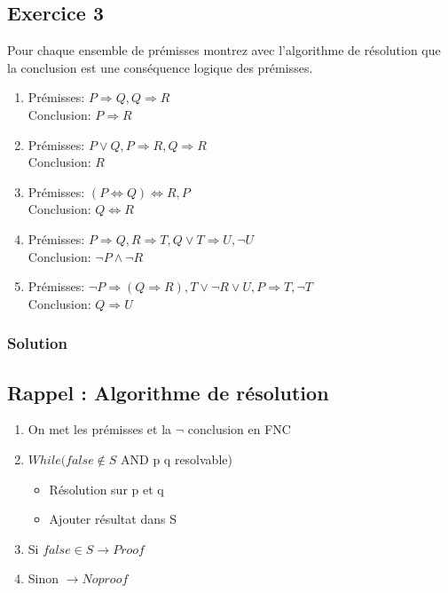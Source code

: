 \subsection*{Exercice 3}
Pour chaque ensemble de prémisses montrez avec l'algorithme de résolution que la conclusion est une conséquence logique des prémisses.
\begin{enumerate}
 \item 
 Prémisses: $P \Rightarrow Q, Q \Rightarrow R$ \\
 Conclusion: $P \Rightarrow R$
 \item
 Prémisses: $P \vee Q, P \Rightarrow R, Q \Rightarrow R$ \\
 Conclusion: $R$
 \item
 Prémisses: $(P \Leftrightarrow Q) \Leftrightarrow R, P$ \\
 Conclusion: $Q \Leftrightarrow R$
 \item
 Prémisses: $P \Rightarrow Q, R \Rightarrow T, Q \vee T \Rightarrow U, \neg U$ \\
 Conclusion: $\neg P \wedge \neg R$
 \item
 Prémisses: $\neg P \Rightarrow (Q \Rightarrow R), T \vee \neg R \vee U, P \Rightarrow T, \neg T$ \\
 Conclusion: $Q \Rightarrow U$
\end{enumerate}

    \subsubsection*{Solution}
  
    \subsection*{Rappel : Algorithme de résolution}
    
        \begin{enumerate}
            \item On met les prémisses et la $\neg$ conclusion en FNC
            \item $While(false \notin S$ AND p q resolvable)
            \begin{itemize}
                \item Résolution sur p et q
                \item Ajouter résultat dans S
            \end{itemize}
            \item Si $false \in S \rightarrow Proof$
            \item Sinon $\rightarrow No proof $
        \end{enumerate}
        
